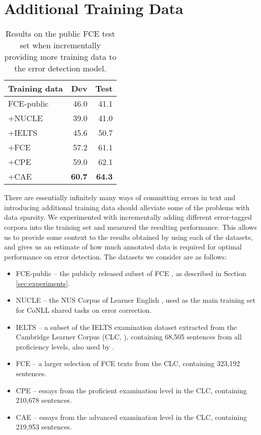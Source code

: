 \documentclass[11pt]{article}
\begin{document}
\section{Additional Training Data}
\label{sec:bigdata}

\begin{table}[t]
\setlength\tabcolsep{14.5pt}
\begin{tabular}{lrr} \toprule
Training data & Dev  & Test  \\ \midrule
FCE-public & 46.0 & 41.1 \\
+NUCLE & 39.0 & 41.0 \\
+IELTS & 45.6 & 50.7 \\
+FCE & 57.2 & 61.1 \\
+CPE & 59.0 & 62.1 \\
+CAE & \textbf{60.7} & \textbf{64.3} \\ \bottomrule
\end{tabular}
\caption{Results on the public FCE test set when incrementally providing more training data to the error detection model.}
\label{tab:bigdata}
\end{table}







There are essentially infinitely many ways of committing errors in text and introducing additional training data should alleviate some of the problems with data sparsity. We experimented with incrementally adding different error-tagged corpora into the training set and measured the resulting performance. This allows us to provide some context to the results obtained by using each of the datasets, and gives us an estimate of how much annotated data is required for optimal performance on error detection.
The datasets we consider are as follows:

\begin{itemize}
\setlength\itemsep{-0.1em}
\item FCE-public -- the publicly released subset of FCE \cite{Yannakoudakis2011}, as described in Section \ref{sec:experiments}.
\item NUCLE -- the NUS Corpus of Learner English \cite{Dahlmeier2013}, used as the main training set for CoNLL shared tasks on error correction.
\item IELTS -- a subset of the IELTS examination dataset extracted from the Cambridge Learner Corpus (CLC, ), containing 68,505 sentences from all proficiency levels, also used by .
\item FCE -- a larger selection of FCE texts from the CLC, containing 323,192 sentences.
\item CPE -- essays from the proficient examination level in the CLC, containing 210,678 sentences.
\item CAE -- essays from the advanced examination level in the CLC, containing 219,953 sentences.

\end{itemize}
\end{document}
